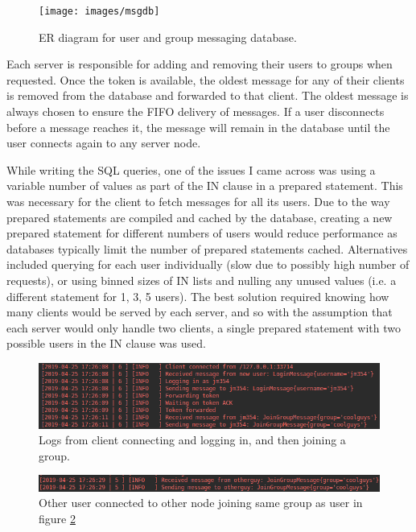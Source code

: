 \documentclass[12pt]{article}
\begin{document}
\begin{figure}[!ht]
	\centering
	\texttt{[image: images/msgdb]}
	\caption{ER diagram for user and group messaging database.}
	\label{fig:msgdb}
\end{figure}

Each server is responsible for adding and removing their users to groups when requested. Once the token is available, the oldest message for any of their clients is removed from the database and forwarded to that client. The oldest message is always chosen to ensure the FIFO delivery of messages. If a user disconnects before a message reaches it, the message will remain in the database until the user connects again to any server node.

While writing the SQL queries, one of the issues I came across was using a variable number of values as part of the IN clause in a prepared statement. This was necessary for the client to fetch messages for all its users. Due to the way prepared statements are compiled and cached by the database, creating a new prepared statement for different numbers of users would reduce performance as databases typically limit the number of prepared statements cached. Alternatives included querying for each user individually (slow due to possibly high number of requests), or using binned sizes of IN lists and nulling any unused values (i.e. a different statement for 1, 3, 5 users). The best solution required knowing how many clients would be served by each server, and so with the assumption that each server would only handle two clients, a single prepared statement with two possible users in the IN clause was used.

\begin{figure}[!ht]
	\centering
	\includegraphics[width=\linewidth]{images/login}
	\caption{Logs from client connecting and logging in, and then joining a group.}
	\label{fig:login}
\end{figure}

\begin{figure}[!ht]
	\centering
	\includegraphics[width=\linewidth]{images/joingroup}
	\caption{Other user connected to other node joining same group as user in figure \ref{fig:login}}
	\label{fig:joingroup}
\end{figure}
\end{document}
